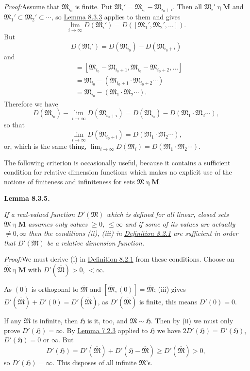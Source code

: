 \documentclass[12pt,b5paper,twoside]{article}
\newcommand{\Hspace}{\mathfrak H}
\newcommand{\M}{\mathbf M}
\newcommand{\Lemma}[1]{%
  \par\smallskip\noindent\phantomsection\label{lem:#1}\textbf{Lemma #1.}\enspace
}
\newcommand{\Proof}{\par\noindent\textit{Proof:}\enspace}
\newcommand{\defref}[1]{\hyperref[def:#1]{Definition #1}}
\newcommand{\lemref}[1]{\hyperref[lem:#1]{Lemma #1}}
\begin{document}
\Proof Assume that $\mathfrak M_{i_0}$ is finite. Put
$\mathfrak M_i'=\mathfrak M_{i_0}-\mathfrak M_{i_0+i}$. Then all
$\mathfrak M_i'\mathbin\eta\M$ and
$\mathfrak M_1'\subset\mathfrak M_2'\subset\cdots$, so \lemref{8.3.3} applies
to them and gives
\[
 \lim_{i\to\infty}D(\mathfrak M_i')
 =D([\mathfrak M_1',\mathfrak M_2',\ldots]).
\]
But
\[
 D(\mathfrak M_i')=D(\mathfrak M_{i_0})-D(\mathfrak M_{i_0+i})
\]
and
\begin{align*}
 [\mathfrak M_1',\mathfrak M_2',\ldots]
 &=[\mathfrak M_{i_0}-\mathfrak M_{i_0+1},
     \mathfrak M_{i_0}-\mathfrak M_{i_0+2},\ldots]\\
 &=\mathfrak M_{i_0}-(\mathfrak M_{i_0+1}\cdot
     \mathfrak M_{i_0+2}\cdots)\\
 &=\mathfrak M_{i_0}-(\mathfrak M_1\cdot\mathfrak M_2\cdots).
\end{align*}
Therefore we have
\[
 D(\mathfrak M_{i_0})-\lim_{i\to\infty}D(\mathfrak M_{i_0+i})
 =D(\mathfrak M_{i_0})-D(\mathfrak M_1\cdot\mathfrak M_2\cdots),
\]
so that
\[
 \lim_{i\to\infty}D(\mathfrak M_{i_0+i})
 =D(\mathfrak M_1\cdot\mathfrak M_2\cdots),
\]
or, which is the same thing,
$\lim_{i\to\infty}D(\mathfrak M_i)=
D(\mathfrak M_1\cdot\mathfrak M_2\cdots)$.

The following criterion is occasionally useful, because it contains a sufficient
condition for relative dimension functions which makes no explicit use of the
notions of finiteness and infiniteness for sets $\mathfrak M\mathbin\eta\M$.

\Lemma{8.3.5}
{\itshape
If a real-valued function $D'(\mathfrak M)$ which is defined for all linear,
closed sets $\mathfrak M\mathbin\eta\M$ assumes only values
$\geq0$, $\leq\infty$ and if some of its values are actually $\ne0,\infty$ then
the conditions (ii), (iii) in \defref{8.2.1} are sufficient in order that
$D'(\mathfrak M)$ be a relative dimension function.}

\Proof We must derive (i) in \defref{8.2.1} from these conditions. Choose an
$\overline{\mathfrak M}\mathbin\eta\M$ with
$D'(\overline{\mathfrak M})>0$, $<\infty$.

As $(0)$ is orthogonal to $\overline{\mathfrak M}$ and
$[\overline{\mathfrak M},(0)]=\overline{\mathfrak M}$; (iii) gives
$D'(\overline{\mathfrak M})+D'(0)=D'(\overline{\mathfrak M})$, as
$D'(\overline{\mathfrak M})$ is finite, this means $D'(0)=0$.

If any $\mathfrak M$ is infinite, then $\Hspace$ is it, too, and
$\mathfrak M\sim\Hspace$. Then by (ii) we must only prove
$D'(\Hspace)=\infty$. By \lemref{7.2.3} applied to $\Hspace$ we have
$2D'(\Hspace)=D'(\Hspace)$, $D'(\Hspace)=0$ or $\infty$. But
\[
 D'(\Hspace)=D'(\overline{\mathfrak M})
 +D'(\Hspace-\overline{\mathfrak M})
 \geq D'(\overline{\mathfrak M})>0,
\]
so $D'(\Hspace)=\infty$. This disposes of all infinite $\mathfrak M$'s.
\end{document}
